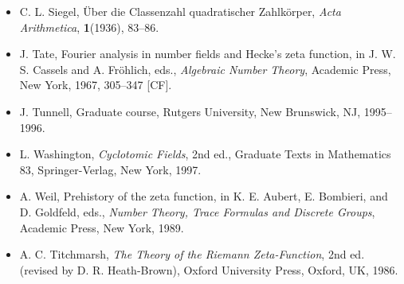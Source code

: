 \begin{itemize}[leftmargin=4.6em,itemsep=0.22em,topsep=0.3em,label={}]
\item[{[Si]}] C. L. Siegel, Über die Classenzahl quadratischer Zahlkörper, \emph{Acta Arithmetica}, \textbf{1}(1936), 83--86.
\item[{[Ta]}] J. Tate, Fourier analysis in number fields and Hecke's zeta function, in J. W. S. Cassels and A. Fröhlich, eds., \emph{Algebraic Number Theory}, Academic Press, New York, 1967, 305--347 [CF].
\item[{[Tu]}] J. Tunnell, Graduate course, Rutgers University, New Brunswick, NJ, 1995--1996.
\item[{[Wa]}] L. Washington, \emph{Cyclotomic Fields}, 2nd ed., Graduate Texts in Mathematics 83, Springer-Verlag, New York, 1997.
\item[{[We]}] A. Weil, Prehistory of the zeta function, in K. E. Aubert, E. Bombieri, and D. Goldfeld, eds., \emph{Number Theory, Trace Formulas and Discrete Groups}, Academic Press, New York, 1989.
\item[{[Ti]}] A. C. Titchmarsh, \emph{The Theory of the Riemann Zeta-Function}, 2nd ed. (revised by D. R. Heath-Brown), Oxford University Press, Oxford, UK, 1986.
\end{itemize}

